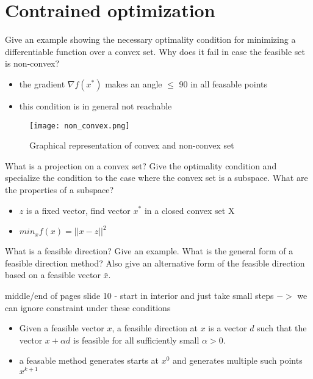 \documentclass{article}
\begin{document}
\section{Contrained optimization}

\begin{question}
  Give an example showing the necessary optimality condition for minimizing a differentiable
  function over a convex set. Why does it fail in case the feasible set is non-convex?
\end{question}
\begin{itemize}
\item the gradient $\nabla f(x^*)$ makes an angle $\leq$ 90 in all feasable points
\item this condition is in general not reachable

\end{itemize}
\begin{figure}[H]
  \texttt{[image: non\_convex.png]}
  \caption{Graphical representation of convex and non-convex set \label{fig:convex}}
\end{figure}

\begin{question}
  What is a projection on a convex set? Give the optimality condition and specialize the condition
  to the case where the convex set is a subspace.  What are the properties of a subspace?
\end{question}
\begin{itemize}
\item $z$ is a fixed vector, find vector $x^*$ in a closed convex set X
\item $min_x f(x) = || x - z || ^2$
\end{itemize}

\begin{question}
  What is a feasible direction? Give an example. What is the general form of a feasible direction
  method? Also give an alternative form of the feasible direction based on a feasible vector
  \(\bar{x}\).
\end{question}
middle/end of pages slide 10 - start in interior and just take small steps $->$ we can ignore
constraint under these conditions
\begin{itemize}
\item Given a feasible vector $x$, a feasible
  direction at $x$ is a vector $d$ such that the
  vector $x + \alpha d$ is feasible for all sufficiently
  small $\alpha > 0$.
\item a feasable method generates starts at $x^0$ and generates multiple such points $x^{k+1}$
\end{itemize}
\end{document}
